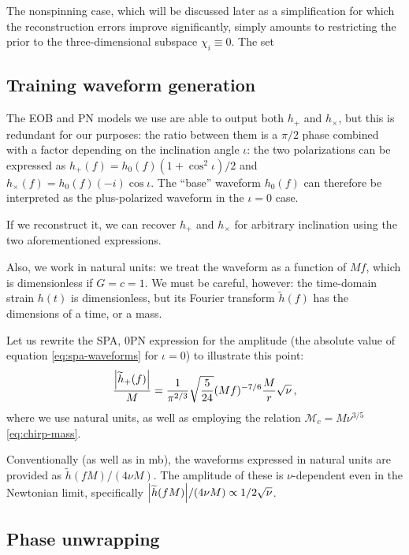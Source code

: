 \documentclass[main.tex]{subfiles}
\begin{document}
The nonspinning case, which will be discussed later as a simplification for which the reconstruction errors improve significantly, simply amounts to restricting the prior to the three-dimensional subspace \(\chi _i \equiv 0\). 
The set

\subsection{Training waveform generation}

The \ac{EOB} and \ac{PN} models we use are able to output both \(h_{+}\) and \(h_{\times }\), but this is redundant for our purposes: the ratio between them is a \(\pi /2\) phase combined with a factor depending on the inclination angle \(\iota \): the two polarizations can be expressed as \(h_{+} (f) = h_0 (f) (1 + \cos^2 \iota ) / 2\) and \(h_{\times }( f) = h_0 (f) (-i) \cos \iota \). 
The ``base'' waveform \(h_0 (f)\) can therefore be interpreted as the plus-polarized waveform in the \(\iota = 0\) case. 

If we reconstruct it, we can recover \(h_{+}\) and \(h_{\times }\) for arbitrary inclination using the two aforementioned expressions.

Also, we work in natural units: we treat the waveform as a function of \(Mf\), which is dimensionless if \(G = c = 1\).
We must be careful, however: the time-domain strain \(h(t)\) is dimensionless, but its Fourier transform \(\widetilde{h}(f)\) has the dimensions of a time, or a mass.

Let us rewrite the \ac{SPA}, 0PN expression for the amplitude (the absolute value of equation \ref{eq:spa-waveforms} for \(\iota = 0\)) to illustrate this point: 
%
\begin{align}
\frac{\abs{\widetilde{h}_+ (f)}}{M} = \frac{1}{\pi^{2/3}} \sqrt{ \frac{5}{24}}
(Mf)^{-7/6} \frac{M}{r} \sqrt{\nu }
\,,
\end{align}
%
where we use natural units, as well as employing the relation \(\mathcal{M}_c = M \nu^{3/5}\) \eqref{eq:chirp-mass}.

Conventionally (as well as in \ac{mb}), the waveforms expressed in natural units are provided as \(\widetilde{h}(fM) / (4 \nu M)\). 
The amplitude of these is  \(\nu \)-dependent even in the Newtonian limit, specifically \(\abs{\widetilde{h}(fM)} / (4 \nu M) \propto 1 / 2 \sqrt{\nu }\). 

\subsection{Phase unwrapping} \label{sec:unwrapping}
\end{document}
